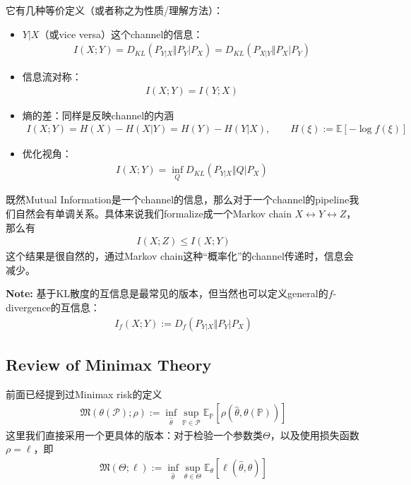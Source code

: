 \documentclass[11pt,a4paper]{ctexart}
\numberwithin{equation}{section}%
\begin{document}
它有几种等价定义（或者称之为性质/理解方法）：
\begin{itemize}[topsep=2pt,itemsep=0pt]
    \item $ Y|X $（或vice versa）这个channel的信息：
    \begin{align*}
        I(X;Y)= D_{KL}(P_{Y|X}\Vert P_Y \big\vert P_X) = D_{KL}(P_{X|Y}\Vert P_X \big\vert P_Y)
    \end{align*}
    \item 信息流对称：
    \begin{align*}
        I(X;Y) = I(Y;X) 
    \end{align*}
    \item 熵的差：同样是反映channel的内涵
    \begin{align*}
        I(X;Y) = H(X) - H(X|Y) = H(Y) - H(Y|X) ,\qquad H(\xi ):= \mathbb{E}\left[ -\log f(\xi ) \right] 
    \end{align*}
    
    \item 优化视角：
    \begin{align*}
        I(X;Y)= \mathop{ \inf }\limits_{Q} D_{KL}(P_{Y|X}\Vert Q \big\vert P_X) 
    \end{align*}
    
    
\end{itemize}


既然Mutual Information是一个channel的信息，那么对于一个channel的pipeline我们自然会有单调关系。具体来说我们formalize成一个Markov chain $ X \leftrightarrow Y \leftrightarrow Z $，那么有
\begin{align*}
    I(X;Z)\leq  I(X;Y)
\end{align*}
这个结果是很自然的，通过Markov chain这种“概率化”的channel传递时，信息会减少。





\textbf{Note:} 基于KL散度的互信息是最常见的版本，但当然也可以定义general的$ f $-divergence的互信息：
\begin{align*}
    I_f(X;Y):= D_f(P_{Y|X}\Vert P_Y \big\vert P_X)
\end{align*}




\subsection{Review of Minimax Theory}


前面已经提到过Minimax risk的定义
\begin{align*}
    \mathfrak{M}(\theta(\mathcal{P}) ;\rho) := \mathop{ \inf  }\limits_{\hat{\theta }} \mathop{ \sup  }\limits_{\mathbb{P}\in \mathcal{P}} \mathbb{E}_\mathbb{P}\left[ \rho(\hat{\theta},\theta(\mathbb{P})) \right]
\end{align*}
这里我们直接采用一个更具体的版本：对于检验一个参数类$ \Theta $，以及使用损失函数$ \rho = \ell $，即
\begin{align*}
    \mathfrak{M}(\Theta;\ell) := \mathop{ \inf  }\limits_{\hat{\theta }} \mathop{ \sup  }\limits_{\theta \in \Theta} \mathbb{E}_\theta\left[ \ell(\hat{\theta},\theta) \right]
\end{align*}
\end{document}
